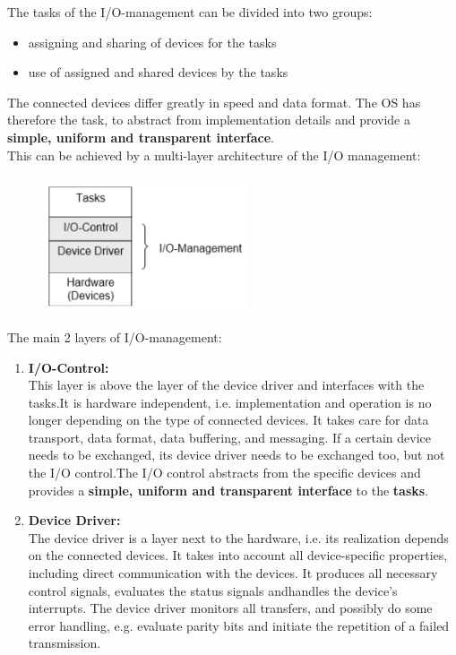 The tasks of the I/O-management can be divided into two groups:

\begin{itemize}
\item  assigning and sharing of devices for the tasks
\item  use of assigned and shared devices by the tasks
\end{itemize}

The connected devices differ greatly in speed and data format. The OS has therefore the task, to abstract from implementation details and provide a \textbf{simple, uniform and transparent interface}. \\

This can be achieved by a multi-layer architecture of the I/O management:

 	\begin{figure}[h]
    \centering
    \includegraphics[width=6cm, height=4cm]{Images/image189.png}
    \label{fig:Fig 68}
    \end{figure}
    
The main 2 layers of I/O-management:

\begin{enumerate}
\item  \textbf{I/O-Control: }\\This layer is above the layer of the device driver and interfaces with the tasks.It is hardware independent, i.e. implementation and operation is no longer depending on the type of connected devices. It takes care for data transport, data format, data buffering, and messaging. If a certain device needs to be exchanged, its device driver needs to be exchanged too, but not the I/O control.The I/O control abstracts from the specific devices and provides a \textbf{simple, uniform and transparent interface} to the \textbf{tasks}.

\item   \textbf{Device Driver:}\\The device driver is a layer next to the hardware, i.e. its realization depends on the connected devices. It takes into account all device-specific properties, including direct communication with the devices. It produces all necessary control signals, evaluates the status signals andhandles the device's interrupts. The device driver monitors all transfers, and possibly do some error handling, e.g. evaluate parity bits and initiate the repetition of a failed transmission.
\end{enumerate}

